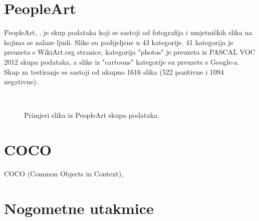\section{PeopleArt}
PeopleArt, \cite{westlake2016detecting}, je skup podataka koji se sastoji od fotografija i umjetničkih slika na kojima se nalaze ljudi. Slike su podijeljene u 43 kategorije. 41 kategorija je preuzeta s WikiArt.org stranice, kategorija "photos" je preuzeta iz PASCAL VOC 2012 skupa podataka, a slike iz "cartoons" kategorije su preuzete s Google-a.
Skup za testiranje se sastoji od ukupno 1616 slika (522 pozitivne i 1094 negativne).

\begin{figure}[H]
 \
 \
 \
\caption{Primjeri slika iz PeopleArt skupa podataka.}
\end{figure}

\section{COCO}
COCO (Common Objects in Context), \cite{DBLP:journals/corr/LinMBHPRDZ14}

\section{Nogometne utakmice}